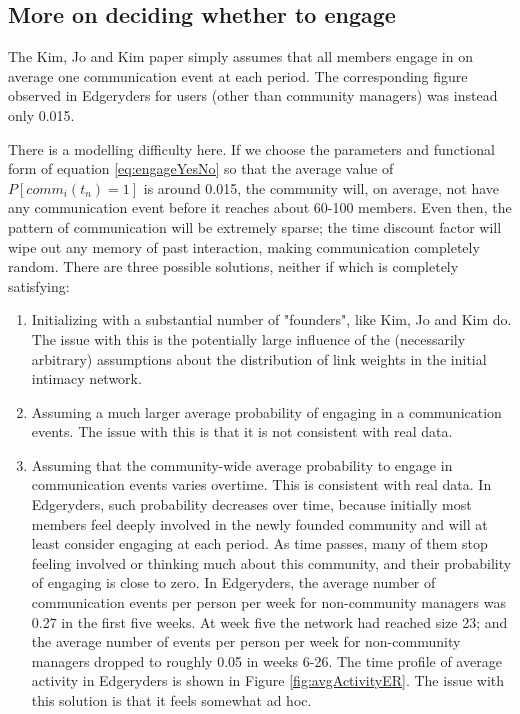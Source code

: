 \documentclass{article}
\begin{document}
\subsection{More on deciding whether to engage}

The Kim, Jo and Kim paper simply assumes that all members engage in on average one communication event at each period. The corresponding figure observed in Edgeryders for users (other than community managers) was instead only 0.015. 

There is a modelling difficulty here. If we choose the parameters and functional form of equation \ref{eq:engageYesNo} so that the average value of $P[comm_i(t_n) = 1]$ is around 0.015, the community will, on average, not have any communication event before it reaches about 60-100 members. Even then, the pattern of communication will be extremely sparse; the time discount factor will wipe out any memory of past interaction, making communication completely random. There are three possible solutions, neither if which is completely satisfying:

\begin{enumerate}
	\item Initializing with a substantial number of "founders", like Kim, Jo and Kim do. The issue with this is the potentially large influence of the (necessarily arbitrary) assumptions about the distribution of link weights in the initial intimacy network.
	\item Assuming a much larger average probability of engaging in a communication events. The issue with this is that it is not consistent with real data.
	\item Assuming that the community-wide average probability to engage in communication events varies overtime. This is consistent with real data. In Edgeryders, such probability decreases over time, because initially most members feel deeply involved in the newly founded community and will at least consider engaging at each period. As time passes, many of them stop feeling involved or thinking much about this community, and their probability of engaging is close to zero. In Edgeryders, the average number of communication events per person per week for non-community managers was 0.27 in the first five weeks. At week five the network had reached size 23; and the average number of events per person per week for non-community managers dropped to roughly  0.05 in weeks 6-26. The time profile of average activity in Edgeryders is shown in Figure \ref{fig:avgActivityER}. The issue with this solution is that it feels somewhat ad hoc. 
\end{enumerate}
\end{document}
